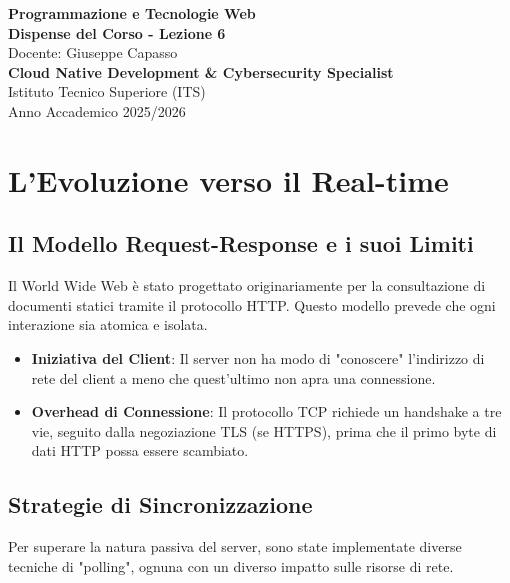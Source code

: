 \documentclass[11pt,a4paper]{report}
\begin{document}
\begin{titlepage}
    \centering
    \vspace*{4cm}
    {\Huge \textbf{\color{primary} Programmazione e Tecnologie Web}} \\[1.5cm]
    {\Large \textbf{Dispense del Corso - Lezione 6}} \\[0.5cm]
    {\large Docente: Giuseppe Capasso} \\[1.5cm]
    {\normalsize \textbf{Cloud Native Development \& Cybersecurity Specialist}} \\
    {\normalsize Istituto Tecnico Superiore (ITS)} \\
    \vfill
    {\normalsize Anno Accademico 2025/2026}
\end{titlepage}

\newpage
\tableofcontents
\newpage

\chapter{L'Evoluzione verso il Real-time}

\section{Il Modello Request-Response e i suoi Limiti}
Il World Wide Web è stato progettato originariamente per la consultazione di documenti statici tramite il protocollo HTTP. Questo modello prevede che ogni interazione sia atomica e isolata.

\begin{itemize}
    \item \textbf{Iniziativa del Client}: Il server non ha modo di "conoscere" l'indirizzo di rete del client a meno che quest'ultimo non apra una connessione.
    \item \textbf{Overhead di Connessione}: Il protocollo TCP richiede un handshake a tre vie, seguito dalla negoziazione TLS (se HTTPS), prima che il primo byte di dati HTTP possa essere scambiato.
\end{itemize}

\section{Strategie di Sincronizzazione}
Per superare la natura passiva del server, sono state implementate diverse tecniche di "polling", ognuna con un diverso impatto sulle risorse di rete.
\end{document}
